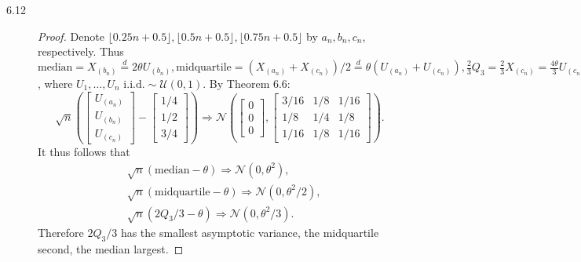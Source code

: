 \documentclass{article}
\newcommand{\gaussian}{\mathcal{N}}
\theoremstyle{definition}
\theoremstyle{plain}
\theoremstyle{remark}
\begin{document}
\begin{description}
\item[6.12]
\begin{proof}
Denote $\lfloor 0.25n + 0.5 \rfloor, \lfloor 0.5n + 0.5 \rfloor, 
\lfloor 0.75n + 0.5 \rfloor$ by $a_n, b_n, c_n$, respectively. Thus 
$\text{median} = X_{(b_n)} \overset{d}{=} 2\theta U_{(b_n)}, 
\text{midquartile} = (X_{(a_n)} + X_{(c_n)})/2 \overset{d}{=} \theta(U_{(a_n)} 
+ U_{(c_n)}),
\frac{2}{3}Q_3 = \frac{2}{3}X_{(c_n)} = \frac{4\theta}{3}U_{(c_n)}$, where
$U_1, \ldots, U_n \text{ i.i.d.} \sim \mathcal{U}(0, 1)$. By Theorem 6.6:
\begin{equation*}
    \sqrt{n}\left(
    \begin{bmatrix}
    U_{(a_n)} \\
    U_{(b_n)} \\
    U_{(c_n)}
    \end{bmatrix} -
    \begin{bmatrix}
    1/4 \\
    1/2 \\
    3/4
    \end{bmatrix}\right) \Rightarrow 
    \gaussian\left(
    \begin{bmatrix}
    0 \\
    0 \\
    0
    \end{bmatrix},
    \begin{bmatrix}
    3/16 & 1/8 & 1/16 \\
    1/8 & 1/4 & 1/8 \\
    1/16 & 1/8 & 1/16
    \end{bmatrix}
    \right).
\end{equation*}
It thus follows that 
\begin{align*}
    & \sqrt{n}(\text{median} - \theta) \Rightarrow \gaussian(0, \theta^2), \\
    & \sqrt{n}(\text{midquartile} - \theta) \Rightarrow \gaussian(0, \theta^2/2),
    \\
    & \sqrt{n}(2Q_3/3 - \theta) \Rightarrow \gaussian(0, \theta^2/3).
\end{align*}
Therefore $2Q_3/3$ has the smallest asymptotic variance, the midquartile second,
the median largest. 
\end{proof}
\end{description}

\newpage
\end{document}
